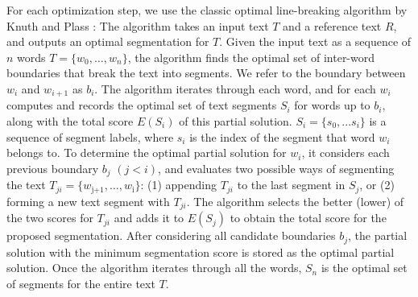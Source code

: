 For each optimization step, we use the classic optimal line-breaking algorithm by Knuth and Plass \cite{knuth1981breaking}: The algorithm takes an input text $T$ and a reference text $R$, and outputs an optimal segmentation for $T$. Given the input text as a sequence of $n$ words $T = \{w_0,\dots,w_n\}$, the algorithm finds the optimal set of inter-word
boundaries that break the text into segments. We refer to the boundary between $w_i$ and $w_{i+1}$ as $b_i$.
%
The algorithm iterates through each word, and for each $w_i$
computes and records the optimal set of text segments $S_i$ for words up to $b_i$, along with the total score $E(S_i)$ of
this partial solution. $S_i =\{s_0, ... s_i\}$ is a sequence of segment labels, where $s_i$ is the index of the segment that word $w_i$ belongs to. To determine the optimal partial solution for $w_i$, it
considers each previous boundary $b_j$ $(j<i)$, and evaluates two possible ways of
segmenting the text $T_{ji} = \{w_\text{j+1},
\dots,w_\text{i}\}$: (1) appending $T_{ji}$ to the last segment in $S_j$, or (2) forming a new text segment with $T_{ji}$. The algorithm selects the better (lower) of the two scores for $T_{ji}$ and adds it
to $E(S_j)$ to obtain the total score for the proposed
segmentation. After considering all candidate boundaries $b_j$, the partial solution with the minimum segmentation score is stored as the optimal partial solution. Once the algorithm iterates through all the words, $S_n$ is the
optimal set of segments for the entire text $T$. 

